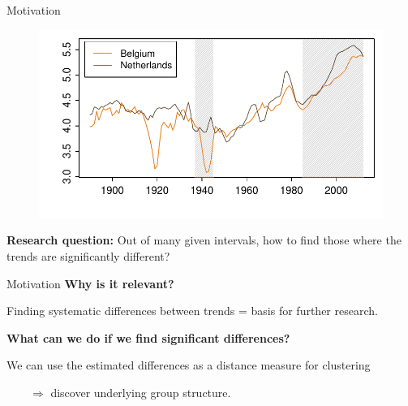 \documentclass[10pt, handout]{beamer}
\begin{document}
\begin{frame}{Motivation}
{\begin{figure}
  	\end{figure}}	
	{\onslide<4->
	\vspace{-46,81mm}
	\begin{figure}
    		\centering
    		\includegraphics[height=0.45\textheight]{plots/hp_BEL_NLD_2.pdf}
  	\end{figure}}	
\vspace{-3mm}
{\textbf{Research question:}
	Out of many given intervals, how to find those where the trends are significantly different?}


\end{frame}

\begin{frame}{Motivation}
\vspace{-4mm}
\textbf{Why is it relevant?}

Finding systematic differences between trends = basis for further research.\pause


\vspace{3mm}

%
%
%

\textbf{What can we do if we find significant differences?}

We can use the estimated differences as a distance measure for clustering

$\quad \quad \Rightarrow$ discover underlying group structure.
 
\end{frame}
\end{document}
